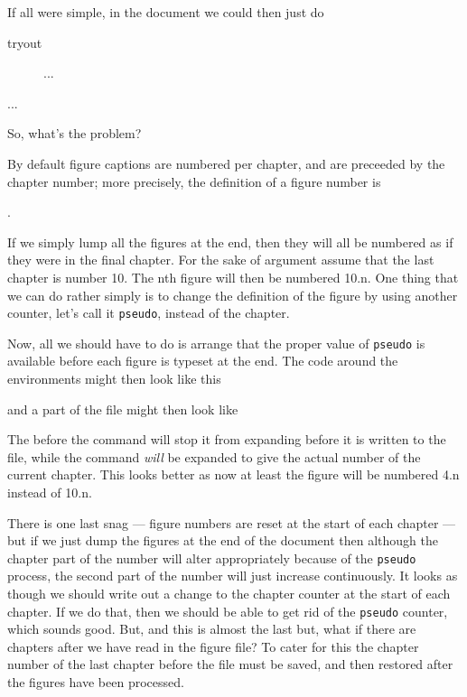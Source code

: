 {{{{    If all were simple, in the document we could then just do
\begin{lcode}
\begin{writeverbatim}{tryout}
\begin{figure} ... \end{figure}
\end{writeverbatim}
...

\end{lcode}

    So, what's the problem?

    By default figure captions are numbered per chapter, and are preceeded
by the chapter number; more precisely, the definition of a figure number
is 
\begin{lcode}
\thechapter.
\end{lcode}
If we simply lump all the figures at 
the end, then they
will all be numbered as if they were in the final chapter. 
For the sake of argument assume that the last chapter is number 10.
The nth figure will then be numbered 10.n.
One thing that we
can do rather simply is to change the definition of the figure by using
another counter, let's call it \texttt{pseudo}, instead of the chapter.
\begin{lcode}
  \renewcommand{\thepseudo}{\arabic{pseudo}}
\renewcommand{\thefigure}{\thepseudo.\arabic{figure}}
\end{lcode}
Now, all we should have to do is arrange that the proper value of 
\texttt{pseudo}
is available before each figure is typeset at the end. The code around
the  environments might then look like this
and a part of the file might then look like
The \cmd{\protect} before the \cmd{\setcounter} command will stop it
from expanding before it is written to the file, while the \cmd{\thechapter}
command \emph{will} be expanded to give the actual number of the current 
chapter. This looks better as now at least the figure will be numbered 4.n 
instead of 10.n.

    There is one last snag --- figure numbers are reset at the start of each
chapter --- but if we just dump the figures at the end of the document
then although the chapter part of the number will alter appropriately
because of the \texttt{pseudo} process,
the second part of the number will just increase continuously. It looks
as though we should write out a change to the chapter counter at the start
of each chapter. If we do that, then we should be able to get rid of the
\texttt{pseudo} counter, which sounds good. But, and this is almost the 
last but,
what if there are chapters after we have read in the figure file? To
cater for this the chapter number of the last chapter before the file must
be saved, and then restored after the figures have been processed.

}}}}

